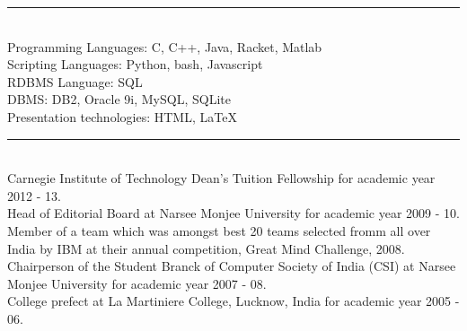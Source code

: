 \documentclass[a4paper,oneside,english]{article}
\begin{document}
\noindent\rule{6in}{0.4pt} \\[4pt]
Programming Languages: C, C++, Java, Racket, Matlab \vspace*{2mm}  \\
Scripting Languages: Python, bash, Javascript \vspace*{2mm} \\ 
RDBMS Language: SQL \vspace*{2mm} \\  
DBMS: DB2, Oracle 9i, MySQL, SQLite \vspace*{2mm} \\ 
Presentation technologies: HTML, \LaTeX \\
\noindent\rule{6in}{0.4pt} \\[4pt]
Carnegie Institute of Technology Dean's Tuition Fellowship for academic year 2012 - 13. \vspace*{2mm} \\
Head of Editorial Board at Narsee Monjee University for academic year 2009 - 10. \vspace*{2mm} \\
\noindent Member of a team which was amongst best 20 teams selected fromm all over India by IBM at their annual competition, Great Mind Challenge, 2008. \vspace*{2mm} \\
Chairperson of the Student Branck of Computer Society of India (CSI) at Narsee Monjee University for academic year 2007 - 08.  \vspace*{2mm} \\
College prefect at La Martiniere College, Lucknow, India for academic year 2005 - 06.
\end{document}
